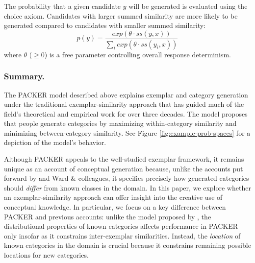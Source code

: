 \documentclass[10pt,letterpaper]{article}
\newcommand\inputpgf[2]{{
\let\pgfimageWithoutPath\pgfimage
\renewcommand{\pgfimage}[2][]{\pgfimageWithoutPath[##1]{#1/##2}}

}}
\begin{document}
The probability that a given candidate $y$ will be generated is evaluated using the \citet{luce1977choice} choice axiom. Candidates with larger summed similarity are more likely to be generated compared to candidates with smaller summed similarity:
\begin{equation}
p(y) = \dfrac
    { exp( { \theta \cdot ss(y, x) } ) }
    { \sum_i{ exp( { \theta \cdot ss(y_i, x) } ) } }
\end{equation}
where $\theta$ ($\geq 0$) is a free parameter controlling overall response determinism. 


\subsubsection{Summary.}

The PACKER model described above explains exemplar and category generation under the traditional exemplar-similarity approach that has guided much of the field's theoretical and empirical work for over three decades. The model proposes that people generate categories by maximizing within-category similarity and minimizing between-category similarity. See Figure \ref{fig:example-prob-spaces} for a depiction of the model's behavior.

\begin{figure*}
    \begin{center}
    \inputpgf{figs/}{example-prob-spaces.pgf}
    \caption{Predicted generation of a category `B' example, following exposure to one member of category `A' and one member of category `B'. Areas in which generation is not likely are shaded white; high probability areas are shaded blue. \textit{Left}: Predictions given $\{\phi = -1$, $\gamma = 0\}$ (contrast influence only). \textit{Center}: Predictions given $\{\phi = 0$, $\gamma = 1\}$ (target influence only).  \textit{Right}: Predictions given $\{\phi = -1$, $\gamma = 1\}$ (both constraints considered).  }
    \label{fig:example-prob-spaces}
    \end{center}
\end{figure*}

Although PACKER appeals to the well-studied exemplar framework, it remains unique as an account of conceptual generation because, unlike the accounts put forward by \citet{jern2013probabilistic} and Ward \& colleagues, it specifies precisely how generated categories should \textit{differ} from known classes in the domain. In this paper, we explore whether an exemplar-similarity approach can offer insight into the creative use of conceptual knowledge. In particular, we focus on a key difference between PACKER and previous accounts: unlike the model proposed by \citeauthor{jern2013probabilistic}, the distributional properties of known categories affects performance in PACKER only insofar as it constrains inter-exemplar similarities. Instead, the \textit{location} of known categories in the domain is crucial because it constrains remaining possible locations for new categories.
\end{document}
